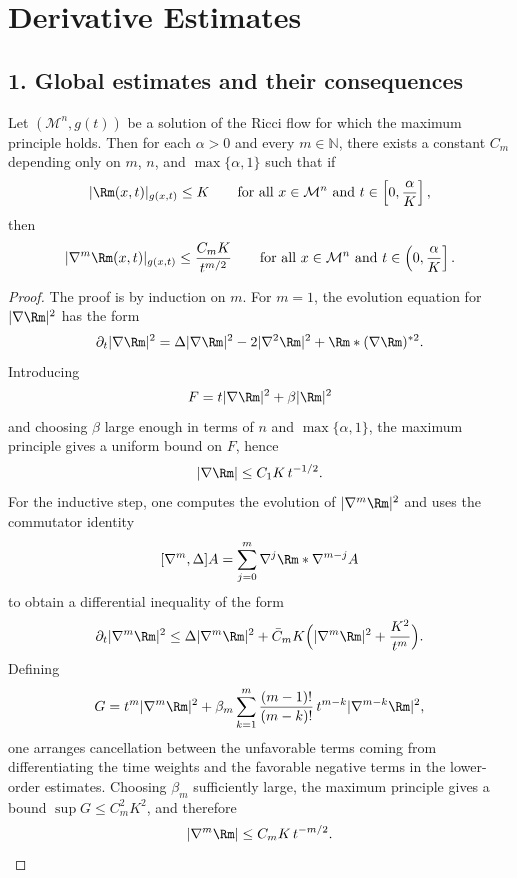 \chapter{Derivative Estimates}

\section*{1. Global estimates and their consequences}

\begin{theorem}
\label{ch07-thm-global-derivative-estimates}
Let \((\mathcal M^n,g(t))\) be a solution of the Ricci flow for which the maximum principle holds. Then for each \(\alpha>0\) and every \(m\in\mathbb N\), there exists a constant \(C_m\) depending only on \(m\), \(n\), and \(\max\{\alpha,1\}\) such that if
\[
|\Rm(x,t)|_{g(x,t)}\le K
\qquad\text{for all }x\in \mathcal M^n\text{ and }t\in\left[0,\frac{\alpha}{K}\right],
\]
then
\[
|\nabla^m \Rm(x,t)|_{g(x,t)}\le \frac{C_m K}{t^{m/2}}
\qquad\text{for all }x\in \mathcal M^n\text{ and }t\in\left(0,\frac{\alpha}{K}\right].
\]
\end{theorem}

\begin{proof}
\sketch The proof is by induction on \(m\). For \(m=1\), the evolution equation for \(|\nabla \Rm|^2\) has the form
\[
\partial_t |\nabla \Rm|^2=\Delta |\nabla \Rm|^2-2|\nabla^2\Rm|^2+\Rm*(\nabla\Rm)^{*2}.
\]
Introducing
\[
F=t|\nabla \Rm|^2+\beta |\Rm|^2
\]
and choosing \(\beta\) large enough in terms of \(n\) and \(\max\{\alpha,1\}\), the maximum principle gives a uniform bound on \(F\), hence
\[
|\nabla \Rm|\le C_1K\,t^{-1/2}.
\]
For the inductive step, one computes the evolution of \(|\nabla^m\Rm|^2\) and uses the commutator identity
\[
[\nabla^m,\Delta]A=\sum_{j=0}^m \nabla^j\Rm*\nabla^{m-j}A
\]
to obtain a differential inequality of the form
\[
\partial_t |\nabla^m\Rm|^2
\le \Delta |\nabla^m\Rm|^2+\bar C_m K\Bigl(|\nabla^m\Rm|^2+\frac{K^2}{t^m}\Bigr).
\]
Defining
\[
G=t^m|\nabla^m\Rm|^2+\beta_m \sum_{k=1}^m \frac{(m-1)!}{(m-k)!}\,t^{m-k}|\nabla^{m-k}\Rm|^2,
\]
one arranges cancellation between the unfavorable terms coming from differentiating the time weights and the favorable negative terms in the lower-order estimates. Choosing \(\beta_m\) sufficiently large, the maximum principle gives a bound \(\sup G\le C_m^2K^2\), and therefore
\[
|\nabla^m\Rm|\le C_mK\,t^{-m/2}.
\]
\end{proof}

